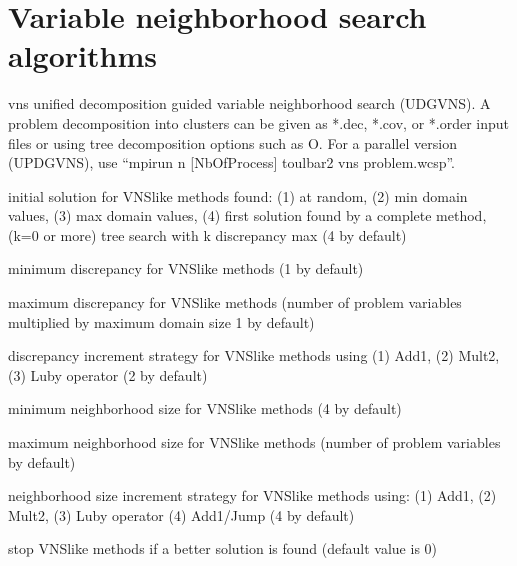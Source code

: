 \documentclass[letterpaper,10pt,openany,oneside,english]{sphinxmanual}
\begin{document}
\section{Variable neighborhood search algorithms}
\label{\detokenize{userdoc:variable-neighborhood-search-algorithms}}\begin{optionlist}{3cm}
\item [\sphinxhyphen{}vns]  
\sphinxAtStartPar
unified decomposition guided variable neighborhood search
 (UDGVNS). A problem decomposition into clusters can be
given as *.dec, *.cov, or *.order input files or using tree
decomposition options such as \sphinxhyphen{}O. For a parallel version (UPDGVNS),
use “mpirun \sphinxhyphen{}n {[}NbOfProcess{]} toulbar2 \sphinxhyphen{}vns problem.wcsp”.
\end{optionlist}
\begin{description}
\sphinxAtStartPar
initial solution for VNS\sphinxhyphen{}like methods found: (\sphinxhyphen{}1) at random, (\sphinxhyphen{}2) min domain values, (\sphinxhyphen{}3) max domain values, (\sphinxhyphen{}4) first solution found by a complete method, (k=0 or more) tree search with k discrepancy max (\sphinxhyphen{}4 by default)

\sphinxAtStartPar
minimum discrepancy for VNS\sphinxhyphen{}like methods (1 by default)

\sphinxAtStartPar
maximum discrepancy for VNS\sphinxhyphen{}like methods (number of problem variables multiplied by maximum domain size \sphinxhyphen{}1 by default)

\sphinxAtStartPar
discrepancy increment strategy for VNS\sphinxhyphen{}like methods using (1) Add1, (2) Mult2, (3) Luby operator (2 by default)

\sphinxAtStartPar
minimum neighborhood size for VNS\sphinxhyphen{}like methods (4 by default)

\sphinxAtStartPar
maximum neighborhood size for VNS\sphinxhyphen{}like methods (number of problem variables by default)

\sphinxAtStartPar
neighborhood size increment strategy for VNS\sphinxhyphen{}like methods using: (1) Add1, (2) Mult2, (3) Luby operator (4) Add1/Jump (4 by default)

\sphinxAtStartPar
stop VNS\sphinxhyphen{}like methods if a better solution is found (default value is 0)

\end{description}
\end{document}
